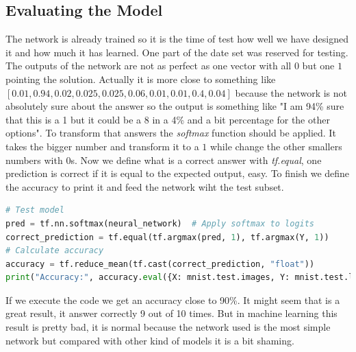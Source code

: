 \subsection{Evaluating the Model}
The network is already trained so it is the time of test how well we have designed it and how much it has learned. One part of the date set was reserved for testing. The outputs of the network are not as perfect as one vector with all $0$ but one $1$ pointing the solution. Actually it is more close to something like $[0.01,0.94,0.02,0.025,0.025,0.06,0.01,0.01,0.4,0.04]$ because the network is not absolutely sure about the answer so the output is something like "I am 94\% sure that this is a 1 but it could be a 8 in a 4\% and a bit percentage for the other options". To transform that answers the \textit{softmax} function should be applied. It takes the bigger number and transform it to a $1$ while change the other smallers numbers with $0$s. Now we define what is a correct answer with \textit{tf.equal}, one prediction is correct if it is equal to the expected output, easy. To finish we define the accuracy to print it and feed the network wiht the test subset.

\begin{lstlisting}[language=python]
# Test model
pred = tf.nn.softmax(neural_network)  # Apply softmax to logits
correct_prediction = tf.equal(tf.argmax(pred, 1), tf.argmax(Y, 1))
# Calculate accuracy
accuracy = tf.reduce_mean(tf.cast(correct_prediction, "float"))
print("Accuracy:", accuracy.eval({X: mnist.test.images, Y: mnist.test.labels}))
\end{lstlisting}

If we execute the code we get an accuracy close to 90\%. It might seem that is a great result, it answer correctly 9 out of 10 times. But in machine learning this result is pretty bad, it is normal because the network used is the most simple network but compared with other kind of models it is a bit shaming.
